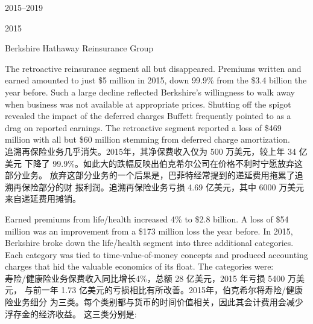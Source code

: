 \begin{chapter}{2015--2019}
\begin{section}{2015}
\begin{subsection}{Berkshire Hathaway Reinsurance Group}
\begin{verseparallel}
  {
    The retroactive reinsurance segment all but disappeared. Premiums written
    and earned amounted to just \$5 million in 2015, down 99.9\% from the \$3.4
    billion the year before. Such a large decline reflected Berkshire's
    willingness to walk away when business was not available at appropriate
    prices. Shutting off the spigot revealed the impact of the deferred charges
    Buffett frequently pointed to as a drag on reported earnings. The
    retroactive segment reported a loss of \$469 million with all but \$60
    million stemming from deferred charge amortization.  \\
  }
  {
    追溯再保险业务几乎消失。2015年，其净保费收入仅为 500 万美元，较上年 34 亿美元
    下降了 99.9\%。如此大的跌幅反映出伯克希尔公司在价格不利时宁愿放弃这部分业务。
    放弃这部分业务的一个后果是，巴菲特经常提到的递延费用拖累了追溯再保险部分的财
    报利润。追溯再保险业务亏损 4.69 亿美元，其中 6000 万美元来自递延费用摊销。
  }
\end{verseparallel}

\begin{verseparallel}
  {
    Earned premiums from life/health increased 4\% to \$2.8 billion. A loss of
    \$54 million was an improvement from a \$173 million loss the year before.
    In 2015, Berkshire broke down the life/health segment into three additional
    categories. Each category was tied to time-value-of-money concepts and
    produced accounting charges that hid the valuable economics of its float.
    The categories were: \\
  }
  {
    寿险/健康险业务保费收入同比增长4\%，总额 28 亿美元，2015 年亏损 5400 万美元，
    与前一年 1.73 亿美元的亏损相比有所改善。2015年，伯克希尔将寿险/健康险业务细分
    为三类。每个类别都与货币的时间价值相关，因此其会计费用会减少浮存金的经济收益。
    这三类分别是:
  }

\end{verseparallel}

{\color{green}{此处应为列表项 \\}}


\end{subsection}
\end{section}
\end{chapter}
